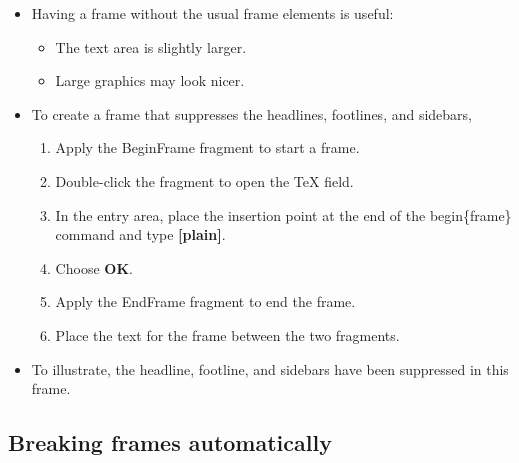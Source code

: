 \documentclass[notes=show,beamer]{beamer}
\begin{document}
\begin{frame}[plain]%


\begin{itemize}
\item Having a frame without the usual frame elements is useful:

\begin{itemize}
\item The text area is slightly larger.

\item Large graphics may look nicer.
\end{itemize}

\item To create a frame that suppresses the headlines, footlines, and
sidebars,

\begin{enumerate}
\item Apply the BeginFrame fragment to start a frame.

\item Double-click the fragment to open the TeX field.

\item In the entry area, place the insertion point at the end of the 
\TEXTsymbol{\backslash}begin\{frame\} command and type \textbf{[plain]}.

\item Choose \textbf{OK}.

\item Apply the EndFrame fragment to end the frame.

\item Place the text for the frame between the two fragments.
\end{enumerate}

\item To illustrate, the headline, footline, and sidebars have been
suppressed in this frame.
\end{itemize}

\end{frame}%

\subsection{Breaking frames automatically}
\end{document}
